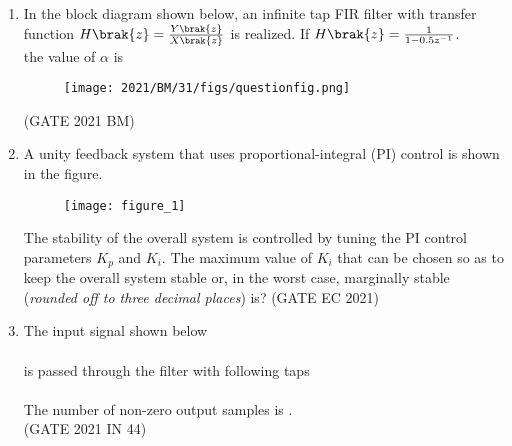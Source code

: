 \begin{enumerate}[label=\thechapter.\arabic*,ref=\thechapter.\theenumi]
\item In the block diagram shown below, an infinite tap FIR filter with transfer function $H\brak{z}=\frac{Y\brak{z}}{X\brak{z}}$ is realized. If $H\brak{z}=\frac{1}{1-0.5z^{-1}}$.\\the value of $\alpha$ is
\begin{figure}[h]
    \texttt{[image: 2021/BM/31/figs/questionfig.png]}
    \label{fig:question31bm}
\end{figure} \hfill(GATE 2021 BM)\\
\solution

\pagebreak
\item A unity feedback system that uses proportional-integral (PI) control is shown in the figure.
 \begin{figure}[!ht]    
    \centering
\graphicspath{ {2021/EC/48/figs} }
\texttt{[image: figure\_1]}
\label{figure:ee25-gate4-graph}
\end{figure}
The stability of the overall system is controlled by tuning the PI control parameters $K_p$ and $K_i$. The maximum value of $K_i$ that can be chosen so as to keep the overall system stable or, in the worst case, marginally stable (\textit{rounded off to three decimal places}) is?
\hfill{(GATE EC 2021)}\\
\solution

\pagebreak

\item
The input signal shown below \\
\\
is passed through the filter with following taps\\
\\
The number of non-zero output samples is \underline{\hspace{1cm}}.\\
\hfill(GATE 2021 IN 44)
\solution

\pagebreak

\end{enumerate}
